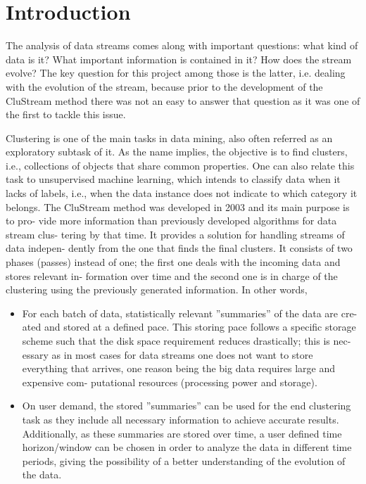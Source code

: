 \documentclass{llncs}
\begin{document}
\section{Introduction}


The analysis of data streams comes along with important questions: what kind of
data is it? What important information is contained in it? How does the stream
evolve? The key question for this project among those is the latter, i.e. dealing with
the evolution of the stream, because prior to the development of the CluStream \cite{clustreamOrig}
method there was not an easy to answer that question as it was one of the first to
tackle this issue.

Clustering is one of the main tasks in data mining, also often referred as an
exploratory subtask of it. As the name implies, the objective is to find clusters, i.e.,
collections of objects that share common properties. One can also relate this task
to unsupervised machine learning, which intends to classify data when it lacks of
labels, i.e., when the data instance does not indicate to which category it belongs.
The CluStream method was developed in 2003 \cite{clustreamOrig} and its main purpose is to pro-
vide more information than previously developed algorithms for data stream clus-
tering by that time. It provides a solution for handling streams of data indepen-
dently from the one that finds the final clusters. It consists of two phases (passes)
instead of one; the first one deals with the incoming data and stores relevant in-
formation over time and the second one is in charge of the clustering using the
previously generated information. In other words,

\begin{itemize}
 \item For each batch of data, statistically relevant ”summaries” of the data are cre-
ated and stored at a defined pace. This storing pace follows a specific storage
scheme such that the disk space requirement reduces drastically; this is nec-
essary as in most cases for data streams one does not want to store everything
that arrives, one reason being the big data requires large and expensive com-
putational resources (processing power and storage).
\item On user demand, the stored ”summaries” can be used for the end clustering
task as they include all necessary information to achieve accurate results.
Additionally, as these summaries are stored over time, a user defined time
horizon/window can be chosen in order to analyze the data in different time
periods, giving the possibility of a better understanding of the evolution of
the data.
\end{itemize}
\end{document}

